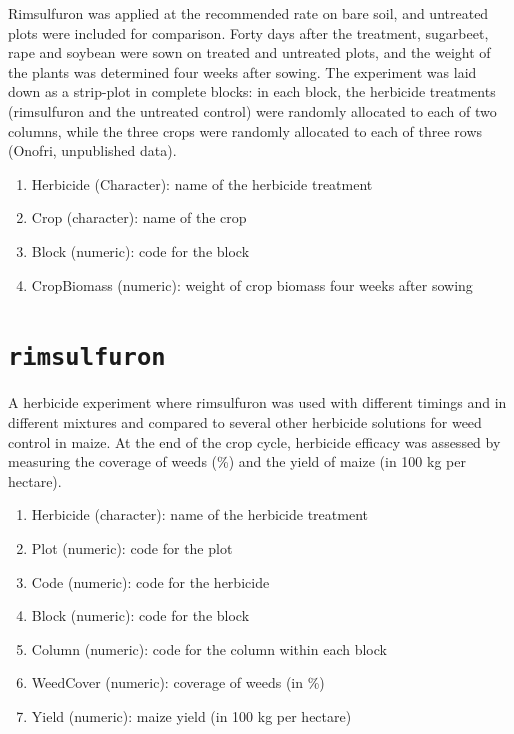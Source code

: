 \documentclass[
  letterpaper,
  DIV=11,
  numbers=noendperiod]{scrreprt}
\providecommand{\tightlist}{%
  \setlength{\itemsep}{0pt}\setlength{\parskip}{0pt}}
\begin{document}

Rimsulfuron was applied at the recommended rate on bare soil, and
untreated plots were included for comparison. Forty days after the
treatment, sugarbeet, rape and soybean were sown on treated and
untreated plots, and the weight of the plants was determined four weeks
after sowing. The experiment was laid down as a strip-plot in complete
blocks: in each block, the herbicide treatments (rimsulfuron and the
untreated control) were randomly allocated to each of two columns, while
the three crops were randomly allocated to each of three rows (Onofri,
unpublished data).

\begin{enumerate}
\def\labelenumi{\arabic{enumi}.}
\tightlist
\item
  Herbicide (Character): name of the herbicide treatment
\item
  Crop (character): name of the crop
\item
  Block (numeric): code for the block
\item
  CropBiomass (numeric): weight of crop biomass four weeks after sowing
\end{enumerate}

\section*{\texorpdfstring{\texttt{rimsulfuron}}{rimsulfuron}}\label{rimsulfuron}


A herbicide experiment where rimsulfuron was used with different timings
and in different mixtures and compared to several other herbicide
solutions for weed control in maize. At the end of the crop cycle,
herbicide efficacy was assessed by measuring the coverage of weeds (\%)
and the yield of maize (in 100 kg per hectare).

\begin{enumerate}
\def\labelenumi{\arabic{enumi}.}
\tightlist
\item
  Herbicide (character): name of the herbicide treatment
\item
  Plot (numeric): code for the plot
\item
  Code (numeric): code for the herbicide
\item
  Block (numeric): code for the block
\item
  Column (numeric): code for the column within each block
\item
  WeedCover (numeric): coverage of weeds (in \%)
\item
  Yield (numeric): maize yield (in 100 kg per hectare)
\end{enumerate}
\end{document}

